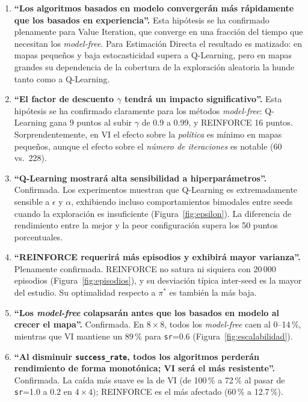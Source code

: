 \documentclass[11pt,a4paper]{article}
\begin{document}
\begin{enumerate}
  \item \textbf{``Los algoritmos basados en modelo convergerán más rápidamente que los basados en experiencia''.} Esta hipótesis se ha confirmado plenamente para Value Iteration, que converge en una fracción del tiempo que necesitan los \emph{model-free}. Para Estimación Directa el resultado es matizado: en mapas pequeños y baja estocasticidad supera a Q-Learning, pero en mapas grandes su dependencia de la cobertura de la exploración aleatoria la hunde tanto como a Q-Learning.

  \item \textbf{``El factor de descuento $\gamma$ tendrá un impacto significativo''.} Esta hipótesis se ha confirmado claramente para los métodos \emph{model-free}: Q-Learning gana 9 puntos al subir $\gamma$ de 0.9 a 0.99, y REINFORCE 16 puntos. Sorprendentemente, en VI el efecto sobre la \emph{política} es mínimo en mapas pequeños, aunque el efecto sobre el \emph{número de iteraciones} es notable (60 vs.\ 228).

  \item \textbf{``Q-Learning mostrará alta sensibilidad a hiperparámetros''.} Confirmada. Los experimentos muestran que Q-Learning es extremadamente sensible a $\epsilon$ y $\alpha$, exhibiendo incluso comportamientos bimodales entre seeds cuando la exploración es insuficiente (Figura~\ref{fig:epsilon}). La diferencia de rendimiento entre la mejor y la peor configuración supera los 50 puntos porcentuales.

  \item \textbf{``REINFORCE requerirá más episodios y exhibirá mayor varianza''.} Plenamente confirmada. REINFORCE no satura ni siquiera con 20\,000 episodios (Figura~\ref{fig:episodios}), y su desviación típica inter-seed es la mayor del estudio. Su optimalidad respecto a $\pi^{\ast}$ es también la más baja.

  \item \textbf{``Los \emph{model-free} colapsarán antes que los basados en modelo al crecer el mapa''.} Confirmada. En $8\times 8$, todos los \emph{model-free} caen al 0--14\,\%, mientras que VI mantiene un 89\,\% para \texttt{sr}=0.6 (Figura~\ref{fig:escalabilidad}).

  \item \textbf{``Al disminuir \texttt{success\_rate}, todos los algoritmos perderán rendimiento de forma monotónica; VI será el más resistente''.} Confirmada. La caída más suave es la de VI (de 100\,\% a 72\,\% al pasar de \texttt{sr}=1.0 a 0.2 en $4\times 4$); REINFORCE es el más afectado (60\,\% a 12.7\,\%).
\end{enumerate}
\end{document}
